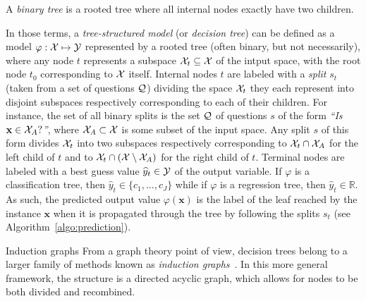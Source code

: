 \begin{definition}
A \emph{binary tree} is a rooted tree where all internal nodes exactly
have two children.
\end{definition}

In those terms, a \textit{tree-structured model} (or \textit{decision tree})
can be defined as a model $\varphi: {\cal X} \mapsto {\cal Y}$ represented by a
rooted tree (often binary, but not necessarily), where any node $t$ represents
a subspace ${\cal X}_t \subseteq {\cal X}$ of the intput space, with the root
node $t_0$ corresponding to ${\cal X}$ itself. Internal nodes $t$ are labeled with a
\textit{split} $s_t$ (taken from a set of questions ${\cal Q}$) dividing the
space ${\cal X}_t$ they each represent into disjoint subspaces respectively
corresponding to each of their children. For instance, the set of all binary
splits is the set ${\cal Q}$ of questions $s$ of the form \textit{``Is
$\mathbf{x} \in {\cal X}_A?$''}, where ${\cal X}_A \subset {\cal X}$ is some
subset of the input space. Any split $s$ of this form divides ${\cal X}_t$ into
two subspaces respectively corresponding to ${\cal X}_t \cap {\cal X}_A$ for
the left child of $t$ and to ${\cal X}_t \cap ({\cal X}\setminus{\cal X}_A)$
for the right child of $t$. Terminal nodes are labeled with a best guess value
$\widehat{y}_t \in {\cal Y}$ of the output variable. If $\varphi$ is a
classification tree, then $\widehat{y}_t \in \{ c_1, ..., c_J \}$ while if
$\varphi$ is a regression tree, then $\widehat{y}_t \in \mathbb{R}$. As such,
the predicted output value $\varphi(\mathbf{x})$
is the label of the leaf reached by the instance $\mathbf{x}$ when it is propagated through
the tree by following the splits $s_t$ (see Algorithm~\ref{algo:prediction}).


\begin{remark}{Induction graphs}
From a graph theory point of view, decision trees belong to a larger family
of methods known as \textit{induction graphs}~\citep{zighed:2000}. In this more
general framework, the structure is a directed acyclic graph, which allows for
nodes to be both divided and recombined.
\end{remark}

